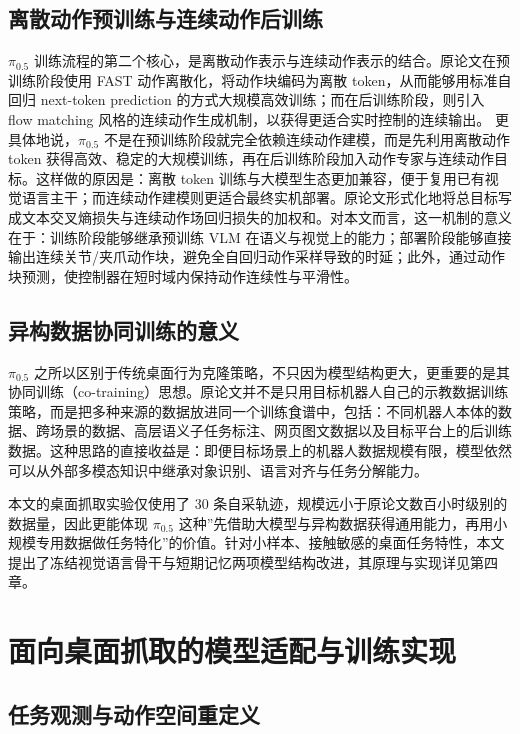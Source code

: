 \subsection{离散动作预训练与连续动作后训练}

$\pi_{0.5}$ 训练流程的第二个核心，是离散动作表示与连续动作表示的结合。原论文在预训练阶段使用 FAST 动作离散化\cite{pertsch2025fast}，将动作块编码为离散 token，从而能够用标准自回归 next-token prediction 的方式大规模高效训练；而在后训练阶段，则引入 flow matching\cite{lipman2022flowmatching} 风格的连续动作生成机制，以获得更适合实时控制的连续输出。
更具体地说，$\pi_{0.5}$ 不是在预训练阶段就完全依赖连续动作建模，而是先利用离散动作 token 获得高效、稳定的大规模训练，再在后训练阶段加入动作专家与连续动作目标。这样做的原因是：离散 token 训练与大模型生态更加兼容，便于复用已有视觉语言主干；而连续动作建模则更适合最终实机部署。原论文形式化地将总目标写成文本交叉熵损失与连续动作场回归损失的加权和\cite{black2025pi05}。对本文而言，这一机制的意义在于：训练阶段能够继承预训练 VLM 在语义与视觉上的能力；部署阶段能够直接输出连续关节/夹爪动作块，避免全自回归动作采样导致的时延；此外，通过动作块预测，使控制器在短时域内保持动作连续性与平滑性。

\subsection{异构数据协同训练的意义}

$\pi_{0.5}$ 之所以区别于传统桌面行为克隆策略，不只因为模型结构更大，更重要的是其协同训练（co-training）思想。原论文并不是只用目标机器人自己的示教数据训练策略，而是把多种来源的数据放进同一个训练食谱中，包括：不同机器人本体的数据、跨场景的数据、高层语义子任务标注、网页图文数据以及目标平台上的后训练数据\cite{black2025pi05}。这种思路的直接收益是：即便目标场景上的机器人数据规模有限，模型依然可以从外部多模态知识中继承对象识别、语言对齐与任务分解能力。

本文的桌面抓取实验仅使用了 30 条自采轨迹，规模远小于原论文数百小时级别的数据量，因此更能体现 $\pi_{0.5}$ 这种”先借助大模型与异构数据获得通用能力，再用小规模专用数据做任务特化”的价值。针对小样本、接触敏感的桌面任务特性，本文提出了冻结视觉语言骨干与短期记忆两项模型结构改进，其原理与实现详见第四章。

\section{面向桌面抓取的模型适配与训练实现}
\label{sec:pi05-training}

\subsection{任务观测与动作空间重定义}

